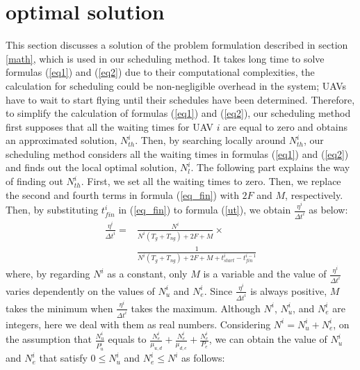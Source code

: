 \documentclass[journal]{IEEEtran}
\begin{document}
\appendices
\section{optimal solution}\label{ape}
This section discusses a solution of the problem formulation described in section \ref{math}, which is used in our scheduling method.
%
It takes long time to solve formulas (\ref{eq1}) and (\ref{eq2}) due to their computational complexities, the calculation for scheduling could be non-negligible overhead in the system; UAVs have to wait to start flying until their schedules have been determined.
%
%
Therefore, to simplify the calculation of formulas (\ref{eq1}) and (\ref{eq2}), our scheduling method first supposes that all the waiting times for UAV $i$ are equal to zero and obtains an approximated solution, $N_{th}^i$.
Then, by searching locally around $N_{th}^i$, our scheduling method considers all the waiting times in formulas (\ref{eq1}) and (\ref{eq2}) and finds out the local optimal solution, $N_{l}^i$.
The following part explains the way of finding out $N_{th}^i$.
%
First, we set all the waiting times to zero.
%
Then, we replace the second and fourth terms in formula (\ref{eq_fin}) with $2F$ and $M$, respectively.
%
Then, by substituting ${t_{fin}^i}$ in (\ref{eq_fin}) to formula (\ref{ut}), we obtain $\frac{\eta^i}{{\Delta{t}}^i}$ as below:
%
\begin{align}
\frac{\eta^{i}}{{\Delta{t}}^i}
=&\frac{N^i}{N^i({T_g}+T_{ng})+2F+M}\times\nonumber\\
&\frac{1}{N^i({T_g}+T_{ng})+2F+M+t_{start}^i-t_{fin}^{i-1}}\label{eq4}
\end{align}
%
where, by regarding $N^i$ as a constant, only $M$ is a variable and the value of $\frac{\eta^{i}}{{\Delta{t}}^i}$ varies dependently on the values of $N_u^i$ and $N_e^i$.
%
Since $\frac{\eta^{i}}{{\Delta{t}}^i}$ is always positive,  $M$ takes the minimum when $\frac{\eta^{i}}{{\Delta{t}}^i}$ takes the maximum. 
%
Although $N^i$, $N_u^i$, and $N_e^i$ are integers, here we deal with them as real numbers.
%
Considering $N^i=N_u^i + N_e^i$, on the assumption that $\frac{N_u^i}{P_u^i}$ equals to $\frac{N_e^i}{\mu_{u,d}}+\frac{N_e^i}{\mu_{d,e}}+\frac{N_e^i}{P_e}$, we can obtain the value of $N_u^i$ and $N_e^i$ that satisfy $0\leq{N_u^i}$ and ${N_e^i}\leq{N^i}$ as follows:
\end{document}
